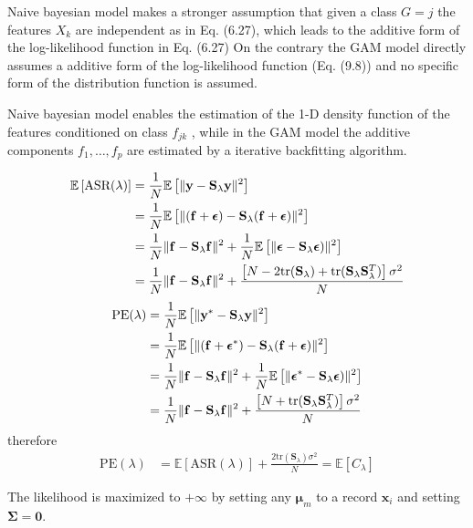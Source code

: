 \begin{exercise}
  Naive bayesian model makes a stronger assumption that given a class $G = j$
  the features $X_k$ are independent as in Eq. (6.27), which leads to the
  additive form of the log-likelihood function in Eq. (6.27)  On the contrary
  the GAM model directly assumes a additive form of the log-likelihood function
  (Eq. (9.8)) and no specific form of the distribution function is assumed.
  
  Naive bayesian model enables the estimation of the 1-D density function of the
  features conditioned on class $f_{jk}$ , while in the GAM model the additive
  components $f_1,\ldots, f_p$ are estimated by a iterative backfitting
  algorithm.
\end{exercise}

\begin{exercise}
  \begin{align}
    \mathbb{E}\left[\mbox{ASR}(\lambda)\right] & = \frac{1}{N}
    \mathbb{E}\left[ \|\mathbf{y} - \mathbf{S}_{\lambda}\mathbf{y}\|^2\right]
    \notag\\
    &= \frac{1}{N}\mathbb{E}\left[\|(\mathbf{f} + \bm{\epsilon}) -
    \mathbf{S}_{\lambda}(\mathbf{f} + \bm{\epsilon})\|^2 \right] \notag\\
    &= \frac{1}{N} \|\mathbf{f} - \mathbf{S}_{\lambda}\mathbf{f}\|^2 +
    \frac{1}{N} \mathbb{E}\left[\|\bm{\epsilon} -
    \mathbf{S}_{\lambda}\bm{\epsilon})\|^2 \right] \notag \\
    &= \frac{1}{N} \|\mathbf{f} - \mathbf{S}_{\lambda}\mathbf{f}\|^2 +
    \frac{\left[N - 2\mbox{tr}(\mathbf{S}_{\lambda}) +
    \mbox{tr}(\mathbf{S}_{\lambda}\mathbf{S}_{\lambda}^T)\right]\sigma^2}{N}
  \end{align}
  \begin{align}
    \mbox{PE}(\lambda) & = \frac{1}{N}\mathbb{E}\left[\|\mathbf{y}^* -  
    \mathbf{S}_{\lambda}\mathbf{y}\|^2 \right] \notag\\
    &= \frac{1}{N}\mathbb{E}\left[\|(\mathbf{f} + \bm{\epsilon}^*) -
    \mathbf{S}_{\lambda}(\mathbf{f} + \bm{\epsilon})\|^2 \right] \notag\\
    &= \frac{1}{N} \|\mathbf{f} - \mathbf{S}_{\lambda}\mathbf{f}\|^2 +
    \frac{1}{N} \mathbb{E}\left[\|\bm{\epsilon}^* -
    \mathbf{S}_{\lambda}\bm{\epsilon})\|^2 \right] \notag \\
    &= \frac{1}{N} \|\mathbf{f} - \mathbf{S}_{\lambda}\mathbf{f}\|^2 +
    \frac{\left[N +
    \mbox{tr}(\mathbf{S}_{\lambda}\mathbf{S}_{\lambda}^T)\right]\sigma^2}{N}
  \end{align}
  therefore
  \begin{align}
    \mbox{PE}(\lambda) & =  \mathbb{E}\left[\mbox{ASR}(\lambda)\right] +
    \frac{2\mbox{tr}(\mathbf{S}_{\lambda})\sigma^2}{N} =
    \mathbb{E}\left[ C_{\lambda}\right]
  \end{align}
\end{exercise}

\begin{exercise}
  The likelihood is maximized to $+\infty$ by setting any $\bm{\mu}_m$ to a
  record $\mathbf{x}_i$ and setting $\mathbf{\Sigma} = \mathbf{0}$.
\end{exercise}

\begin{exercise}[(Program)]
\end{exercise}
